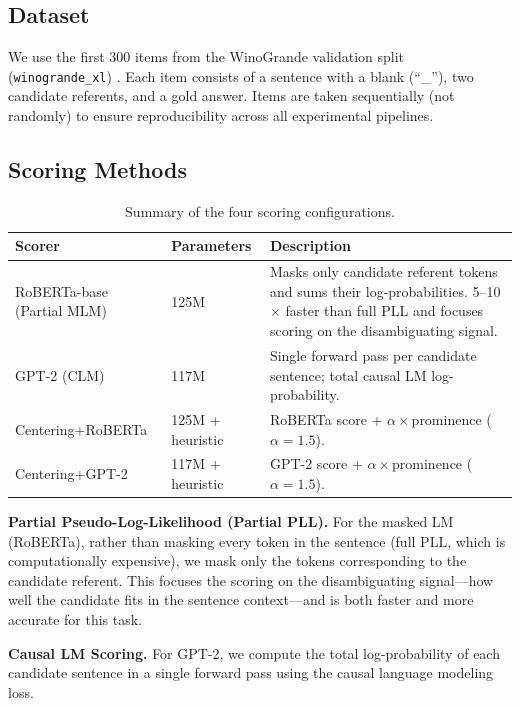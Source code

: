 \documentclass[11pt]{article}
\begin{document}
\subsection{Dataset}

We use the first 300 items from the WinoGrande validation split (\texttt{winogrande\_xl}) \citep{sakaguchi2019}. Each item consists of a sentence with a blank (``\_''), two candidate referents, and a gold answer. Items are taken sequentially (not randomly) to ensure reproducibility across all experimental pipelines.

\subsection{Scoring Methods}

\begin{table}[t]
\centering
\caption{Summary of the four scoring configurations.}
\label{tab:models}
\begin{tabular}{@{}p{4cm}p{2.5cm}p{9cm}@{}}
\toprule
\textbf{Scorer} & \textbf{Parameters} & \textbf{Description} \\
\midrule
RoBERTa-base (Partial MLM) & 125M & Masks only candidate referent tokens and sums their log-probabilities. 5--10$\times$ faster than full PLL and focuses scoring on the disambiguating signal. \\
GPT-2 (CLM) & 117M & Single forward pass per candidate sentence; total causal LM log-probability. \\
Centering+RoBERTa & 125M + heuristic & RoBERTa score + $\alpha \times \text{prominence}$ ($\alpha=1.5$). \\
Centering+GPT-2 & 117M + heuristic & GPT-2 score + $\alpha \times \text{prominence}$ ($\alpha=1.5$). \\
\bottomrule
\end{tabular}
\end{table}

\textbf{Partial Pseudo-Log-Likelihood (Partial PLL).} For the masked LM (RoBERTa), rather than masking every token in the sentence (full PLL, which is computationally expensive), we mask only the tokens corresponding to the candidate referent. This focuses the scoring on the disambiguating signal---how well the candidate fits in the sentence context---and is both faster and more accurate for this task.

\textbf{Causal LM Scoring.} For GPT-2, we compute the total log-probability of each candidate sentence in a single forward pass using the causal language modeling loss.
\end{document}
